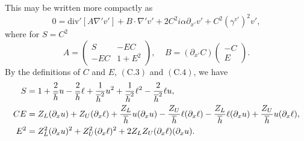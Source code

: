 This may be written more compactly as
\begin{equation*}0=\text{div}'[A\nabla' v']+B\cdot \nabla' v' +2C^2i\alpha\partial_{x'}v'+C^2(\gamma^{v'})^2v',\end{equation*}
where for $S=C^2$
$$A=\begin{pmatrix}
    S & -EC\\
    -EC & 1+E^2
  \end{pmatrix}, ~~~~~
  B=(\partial_{x'}C)\begin{pmatrix}
    -C\\
    E
  \end{pmatrix}.
$$
By the definitions of $C$ and $E$, $(\text{C}.3)$ and $(\text{C}.4)$, we have 
\begin{align*}
S&=1 + \frac{2}{\overline{h}}u-\frac{2}{\overline{h}}\ell+\frac{1}{\overline{h}^2}u^2+\frac{1}{\overline{h}^2}\ell^2-\frac{2}{\overline{h}^2}\ell u,\allowdisplaybreaks\\
CE&=Z_L(\partial_x u)+Z_U(\partial_x \ell) + \frac{Z_L}{\overline{h}}u(\partial_x u)-\frac{Z_U}{\overline{h}}\ell(\partial_x \ell)-\frac{Z_L}{\overline{h}}\ell(\partial_x u)+\frac{Z_U}{\overline{h}}u(\partial_x \ell),\\
E^2&=Z_L^2(\partial_x u)^2 + Z_U^2(\partial_x \ell)^2 + 2Z_LZ_U(\partial_x \ell)(\partial_x u).
\end{align*}

